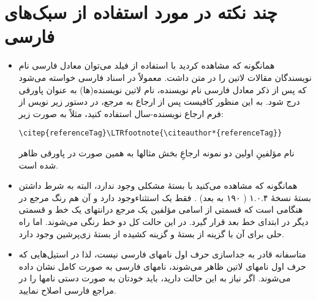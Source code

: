 \documentclass{article}
\theoremstyle{plain}\newtheorem{question}{پرسش}
\begin{document}
\section{چند نکته در مورد استفاده از سبک‌های فارسی}
\begin{itemize}
\item همانگونه که مشاهده کردید با استفاده از فیلد  می‌توان معادل فارسی نام نویسندگان مقالات لاتین را در متن داشت. معمولاً در اسناد فارسی خواسته می‌شود که پس از ذکر معادل فارسی نام نویسنده، نام لاتین نویسنده(ها) به عنوان پاورقی درج شود. به این منظور کافیست پس از ارجاع به مرجع، در دستور زیر نویس از فرم ارجاع نویسنده-سال  استفاده کنید، مثلاً به صورت زیر:
\begin{latin}
\begin{verbatim}
\citep{referenceTag}\LTRfootnote{\citeauthor*{referenceTag}}
\end{verbatim}
\end{latin}
  نام مؤلفینِ اولین دو نمونه ارجاعِ بخش مثالها به همین‌ صورت در پاورقی ظاهر شده است.
 
\item همانگونه که مشاهده می‌کنید با بستهٔ  مشکلی وجود ندارد، البته به شرط داشتن بستهٔ نسخهٔ ۱.۰.۴ ( ۱۹۰ به بعد) . فقط یک استثناءوجود دارد و آن هم رنگ مرجع در هنگامی است که  قسمتی از اسامی مؤلفین یک مرجع درانتهای یک خط و قسمتی دیگر در ابتدای خط بعد قرار گیرد. در این حالت کل دو خط رنگی می‌شوند. اما راه حلی برای آن با  گزینه   از بستهٔ  و گزینه  کشیده  از بستهٔ زی‌پرشین وجود دارد.


\item متاسفانه  قادر به جداسازی حرف اول نامهای فارسی نیست، لذا در استیل‌‌هایی که حرف اول نامهای لاتین ظاهر می‌شوند، نامهای فارسی به صورت کامل نشان داده می‌شوند. اگر نیاز به این حالت دارید، باید خودتان به صورت دستی نامها را در مراجع فارسی اصلاح نمایید.


\end{itemize}
\end{document}
